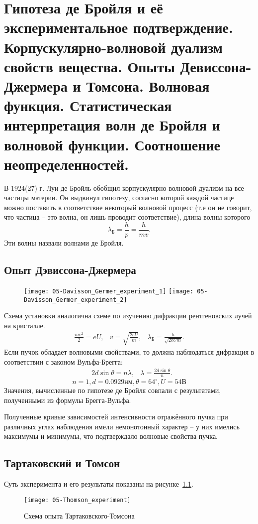 \chapter{Гипотеза де Бройля и её экспериментальное подтверждение. 
Корпускулярно-волновой дуализм свойств вещества. Опыты Девиссона-
Джермера и Томсона. Волновая функция. Статистическая интерпретация 
волн де Бройля и волновой функции. Соотношение неопределенностей.}

В 1924(27) г. Луи де Бройль обобщил корпускулярно-волновой дуализм на все
частицы материи. Он выдвинул гипотезу, согласно которой каждой частице можно
поставить в соответствие некоторый волновой процесс (т.е он не говорит, что
частица -- это волна, он лишь проводит соответствие), длина волны которого
\[
    \lambda_\text{Б} = \frac{h}{p} = \frac{h}{mv}.
\]
Эти волны назвали волнами де Бройля.


\section{Опыт Дэвиссона-Джермера}
\begin{figure}[h!]
    \center
    \texttt{[image: 05-Davisson\_Germer\_experiment\_1]}\hfill
    \texttt{[image: 05-Davisson\_Germer\_experiment\_2]}
\end{figure}
Схема установки аналогична схеме по изучению дифракции рентгеновских лучей на
кристалле.
\begin{align*}
    \frac{mv^2}{2} = eU, & v = \sqrt{\frac{2eU}{m}},
    & \lambda_\text{Б} = \frac{h}{\sqrt{2eUm}}.
\end{align*}
Если пучок обладает волновыми свойствами, то должна наблюдаться дифракция в
соответствии с законом Вульфа-Брегга:
\begin{align*}
    & 2d\sin\theta = n\lambda,
    & \lambda = \frac{2d\sin\theta}{n}.
\end{align*}
\[
    n = 1, d = 0.0929 нм,  \theta = 64^\circ, U = 54 В
\]
Значения, вычисленные по гипотезе де Бройля совпали с результатами, полученными
из формулы Брегга-Вульфа.

Полученные кривые зависимостей интенсивности отражённого пучка при различных
углах наблюдения имели немонотонный характер -- у них имелись максимумы и
минимумы, что подтверждало волновые свойства пучка.

\section{Тартаковский и Томсон}
Суть эксперимента и его результаты показаны на рисунке~\ref{fig:05-Thomson_experiment}.
\begin{figure}[h!]
    \center
    \texttt{[image: 05-Thomson\_experiment]}
    \caption{Схема опыта Тартаковского-Томсона}
    \label{fig:05-Thomson_experiment}
\end{figure}

